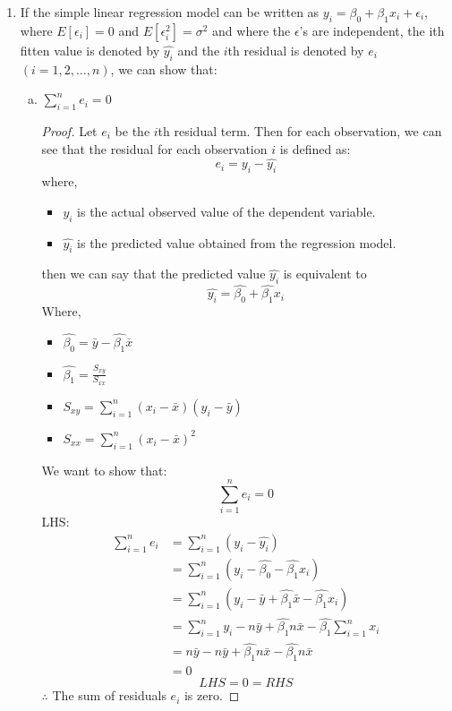 \documentclass[12pt]{article}
\begin{document}
\begin{enumerate}[1.]
    \item If the simple linear regression model can be written as $y_i = \beta_0 + \beta_1 x_i + \epsilon_i$,
        where $E[\epsilon_i] = 0$ and $E[\epsilon^2_i] = \sigma^2$ and where the $\epsilon$'s are independent,
        the ith fitten value is denoted by $\hat{y_i}$ and the $i$th residual is denoted by 
        $e_i$ $(i = 1, 2 , \ldots , n)$, we can show that: 
    \begin{enumerate}[(a)]   
        \item $\sum_{i=1}^{n} e_i = 0$
        \begin{proof}
            Let $e_i$ be the $i$th residual term. Then for each observation, we can see that
            the residual for each observation $i$ is defined as: 
            \[e_i = y_i - \hat{y_i}\]
            where,
            \begin{itemize}
                \item $y_i$ is the actual observed value of the dependent variable.
                \item $\hat{y_i}$ is the predicted value obtained from the regression model.
            \end{itemize}
            then we can say that the predicted value $\hat{y_i}$ is equivalent to
            \[\hat{y_i} = \hat{\beta_0} + \hat{\beta_1} x_i \]
            Where,
            \begin{itemize}
                \item $\hat{\beta_0} = \bar{y} - \hat{\beta_1}\bar{x}$
                \item $\hat{\beta_1} = \frac{S_{xy}}{S_{xx}}$
                \item $S_{xy} = \sum_{i=1}^{n} (x_i - \bar{x})(y_i - \bar{y})$
                \item $S_{xx} = \sum_{i=1}^{n} (x_i - \bar{x})^2$
            \end{itemize}
            We want to show that:
            \[\sum_{i=1}^{n} e_i = 0\]
            LHS$\colon$
            \begin{align*}
                \sum_{i=1}^{n} e_i &= \sum_{i=1}^{n} (y_i - \hat{y_i}) \\
                &= \sum_{i=1}^{n} (y_i - \hat{\beta_0} - \hat{\beta_1} x_i) \\
                &= \sum_{i=1}^{n}(y_i - \bar{y} + \hat{\beta_1}\bar{x} - \hat{\beta_1} x_i) \\
                &= \sum_{i=1}^{n}y_i - n\bar{y} + \hat{\beta_1}n\bar{x} - \hat{\beta_1} \sum_{i=1}^{n}x_i \\
                &= n\bar{y} - n\bar{y} + \hat{\beta_1}n\bar{x} - \hat{\beta_1}n\bar{x} \\ 
                &= 0
            \end{align*}
            \[LHS = 0 = RHS\]
            $\therefore$ The sum of residuals $e_i$ is zero.

            
            
            

        \end{proof}
    \end{enumerate}
\end{enumerate}
\end{document}
